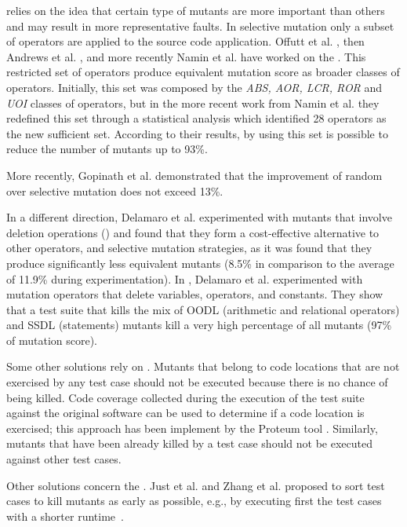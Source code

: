 relies on the idea that certain type of mutants are more important than others and may result in more representative faults. In selective mutation only a subset of operators are applied to the source code application.
Offutt et al. \cite{offutt1996experimental}, then Andrews et al. \cite{andrews2005mutation}, and more recently Namin et al. \cite{siami2008sufficient} have worked on the . This restricted set of operators produce equivalent mutation score as broader classes of operators. Initially, this set was composed by the \textit{ABS, AOR, LCR, ROR} and \textit{UOI} classes of operators, but in the more recent work from Namin et al. \cite{siami2008sufficient} they redefined this set through a statistical analysis which identified 28 operators as the new sufficient set. According to their results, by using this set is possible to reduce the number of mutants up to 93\%. 

More recently, Gopinath et al. \cite{gopinath2016limits} demonstrated that the improvement of random over selective mutation does not exceed 13\%.

In a different direction, Delamaro et al. \cite{delamaro2014designing,delamaro2014experimental} experimented with mutants that involve deletion operations () and found that they form a cost-effective alternative to other operators, and selective mutation strategies, as it was found that they produce significantly less equivalent mutants (8.5\% in comparison to the average of 11.9\% during experimentation). 
In \cite{delamaro2014experimental}, Delamaro et al. experimented with mutation operators that delete variables, operators, and constants. They show that a test suite that kills the mix of OODL (arithmetic and relational operators) and SSDL (statements) mutants kill a very high percentage of all mutants (97\% of mutation score).

Some other solutions rely on . Mutants that belong to code locations that are not exercised by any test case should not be executed because there is no chance of being killed. Code coverage collected during the execution of the test suite against the original software can be used to determine if a code location is exercised; this approach has been implement by the Proteum tool \cite{delamaro1996proteum}.
Similarly, mutants that have been already killed by a test case should not be executed against other test cases.

Other solutions concern the . Just et al. \cite{just2012using} and Zhang et al. \cite{zhang2013faster} proposed to sort test cases to kill mutants as early as possible, e.g., by executing first the test cases with a shorter runtime~\cite{just2012using}. 

